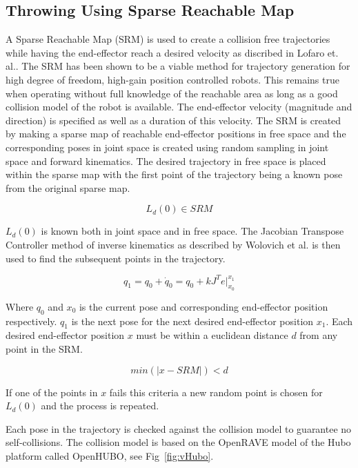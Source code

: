 \subsection{Throwing Using Sparse Reachable Map}\label{sec:sec:srm}

A Sparse Reachable Map (SRM) is used to create a collision free trajectories while having the end-effector reach a desired velocity as discribed in Lofaro et. al.\cite{dlofaro-srm}.
The SRM has been shown to be a viable method for trajectory generation for high degree of freedom, high-gain position controlled robots.  This remains true when operating without full knowledge of the reachable area as long as a good collision model of the robot is available. 
The end-effector velocity (magnitude and direction) is specified as well as a duration of this velocity. 
The SRM is created by making a sparse map of reachable end-effector positions in free space and the corresponding poses in joint space is created using random sampling in joint space and forward kinematics. 
The desired trajectory in free space is placed within the sparse map with the first point of the trajectory being a known pose from the original sparse map. 

\begin{equation}
L_d(0) \in SRM
\end{equation}

$L_d(0)$ is known both in joint space and in free space.
The Jacobian Transpose Controller method of inverse kinematics as described by Wolovich et al.\cite{4048118} is then used to find the subsequent points in the trajectory. 

\begin{equation}
q_1 = q_0 + \dot{q}_0 = q_0 + kJ^Te|_{x_0}^{x_1}
\end{equation}

Where $q_0$ and $x_0$ is the current pose and corresponding end-effector position respectively.  $q_1$ is the next pose for the next desired end-effector position $x_1$.
Each desired end-effector position $x$ must be within a euclidean distance $d$ from any point in the SRM.

\begin{equation}
min \left(|x - SRM| \right) < d
\end{equation}

If one of the points in $x$ fails this criteria a new random point is chosen for $L_d(0)$ and the process is repeated.

Each pose in the trajectory is checked against the collision model to guarantee no self-collisions.  The collision model is based on the OpenRAVE model of the Hubo platform called OpenHUBO, see Fig~\ref{fig:vHubo}.

